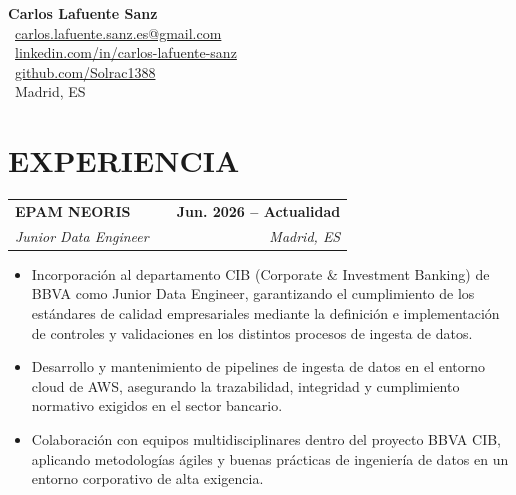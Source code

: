 \documentclass[a4paper,10pt]{article}
\makeatletter
\newcommand{\smallblacksquare}{\raisebox{0.4ex}{\rule{0.6ex}{0.6ex}}}
\newenvironment{joblong}[4]
{
	\begin{tabularx}{\linewidth}{@{}l X r@{}}
		\textbf{#1} & \hfill & \textbf{#2} \\
		\small\textit{#3} & \hfill & \small\textit{#4} \\[3.75pt]
	\end{tabularx}
	\begin{minipage}[t]{\linewidth}
		\begin{itemize}[nosep,after=\strut, leftmargin=1em, itemsep=3pt,label=\smallblacksquare]
		}
		{
		\end{itemize}
	\end{minipage}    
}
\makeatother
\begin{document}
	
	\pagestyle{empty} 
	
	
	\begin{flushleft}
		\Huge{\textbf{Carlos Lafuente Sanz}} \\[4pt]
		\vspace{4pt}
		\normalsize
		\faEnvelope \ \href{mailto:carlos.lafuente.sanz.es@gmail.com}{carlos.lafuente.sanz.es@gmail.com} \\
		\faLinkedin \ \href{https://linkedin.com/in/carlos-lafuente-sanz}{linkedin.com/in/carlos-lafuente-sanz} \\
		\faGithub \ \href{https://github.com/Solrac1388}{github.com/Solrac1388} \\
		\faHome \ Madrid, ES
	\end{flushleft}
	\vspace{-10pt}
	\noindent\titlerule
	\vspace{8pt}
	
	
	\section{EXPERIENCIA}
	
	\begin{joblong}{EPAM NEORIS}{Jun. 2026 – Actualidad}{Junior Data Engineer}{Madrid, ES}
		\item Incorporación al departamento CIB (Corporate \& Investment Banking) de BBVA como Junior Data Engineer, garantizando el cumplimiento de los estándares de calidad empresariales mediante la definición e implementación de controles y validaciones en los distintos procesos de ingesta de datos.
		\item Desarrollo y mantenimiento de pipelines de ingesta de datos en el entorno cloud de AWS, asegurando la trazabilidad, integridad y cumplimiento normativo exigidos en el sector bancario.
		\item Colaboración con equipos multidisciplinares dentro del proyecto BBVA CIB, aplicando metodologías ágiles y buenas prácticas de ingeniería de datos en un entorno corporativo de alta exigencia.
	\end{joblong}
	
\end{document}
